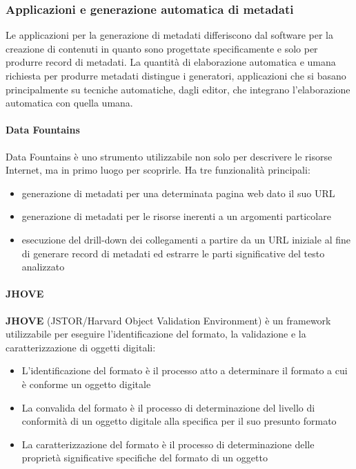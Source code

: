 \subsubsection{Applicazioni e generazione automatica di metadati}
Le applicazioni per la generazione di metadati differiscono dal software per la creazione di contenuti in quanto sono progettate specificamente e solo per produrre record di metadati. 
La quantità di elaborazione automatica e umana richiesta per produrre metadati distingue i generatori, applicazioni che si basano principalmente su tecniche automatiche, dagli editor, che integrano l'elaborazione automatica con quella umana.

\paragraph{Data Fountains}
Data Fountains è uno strumento utilizzabile non solo per descrivere le risorse Internet, ma in primo luogo per scoprirle. Ha tre funzionalità principali:

\begin{itemize}
\item generazione di metadati per una determinata pagina web dato il suo URL
\item generazione di metadati per le risorse inerenti a un argomenti particolare
\item esecuzione del drill-down dei collegamenti a partire da un URL iniziale al fine di generare record di metadati ed estrarre le parti significative del testo analizzato
\end{itemize}

\paragraph{JHOVE}
\textbf{JHOVE} (JSTOR/Harvard Object Validation Environment) è un framework utilizzabile per eseguire l'identificazione del formato, la validazione e la caratterizzazione di oggetti digitali:

\begin{itemize}
\item L'identificazione del formato è il processo atto a determinare il formato a cui è conforme un oggetto digitale
\item La convalida del formato è il processo di determinazione del livello di conformità di un oggetto digitale alla specifica per il suo presunto formato
\item La caratterizzazione del formato è il processo di determinazione delle proprietà significative specifiche del formato di un oggetto
\end{itemize}

